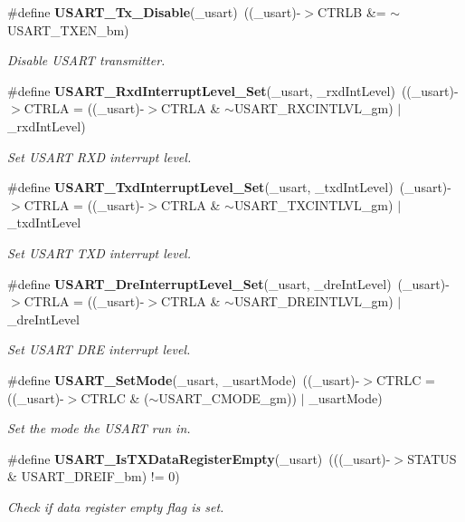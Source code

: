 \begin{DoxyCompactItemize}
\#define {\bf USART\_\-Tx\_\-Disable}(\_\-usart)~((\_\-usart)-\/$>$CTRLB \&= $\sim$USART\_\-TXEN\_\-bm)
\begin{DoxyCompactList}\small\item\em Disable USART transmitter. \item\end{DoxyCompactList}\item 
\#define {\bf USART\_\-RxdInterruptLevel\_\-Set}(\_\-usart, \_\-rxdIntLevel)~((\_\-usart)-\/$>$CTRLA = ((\_\-usart)-\/$>$CTRLA \& $\sim$USART\_\-RXCINTLVL\_\-gm) $|$ \_\-rxdIntLevel)
\begin{DoxyCompactList}\small\item\em Set USART RXD interrupt level. \item\end{DoxyCompactList}\item 
\#define {\bf USART\_\-TxdInterruptLevel\_\-Set}(\_\-usart, \_\-txdIntLevel)~(\_\-usart)-\/$>$CTRLA = ((\_\-usart)-\/$>$CTRLA \& $\sim$USART\_\-TXCINTLVL\_\-gm) $|$ \_\-txdIntLevel
\begin{DoxyCompactList}\small\item\em Set USART TXD interrupt level. \item\end{DoxyCompactList}\item 
\#define {\bf USART\_\-DreInterruptLevel\_\-Set}(\_\-usart, \_\-dreIntLevel)~(\_\-usart)-\/$>$CTRLA = ((\_\-usart)-\/$>$CTRLA \& $\sim$USART\_\-DREINTLVL\_\-gm) $|$ \_\-dreIntLevel
\begin{DoxyCompactList}\small\item\em Set USART DRE interrupt level. \item\end{DoxyCompactList}\item 
\#define {\bf USART\_\-SetMode}(\_\-usart, \_\-usartMode)~((\_\-usart)-\/$>$CTRLC = ((\_\-usart)-\/$>$CTRLC \& ($\sim$USART\_\-CMODE\_\-gm)) $|$ \_\-usartMode)
\begin{DoxyCompactList}\small\item\em Set the mode the USART run in. \item\end{DoxyCompactList}\item 
\#define {\bf USART\_\-IsTXDataRegisterEmpty}(\_\-usart)~(((\_\-usart)-\/$>$STATUS \& USART\_\-DREIF\_\-bm) != 0)
\begin{DoxyCompactList}\small\item\em Check if data register empty flag is set. \item\end{DoxyCompactList}\item 

\end{DoxyCompactItemize}
